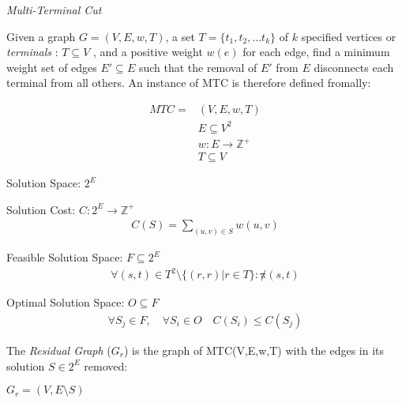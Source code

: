 \documentclass{article}
\begin{document}
\begin{definition}
{\em Multi-Terminal Cut}

Given a graph $G=(V,E,w,T)$, a set $T=\{t_1, t_2, ... t_k\}$ of $k$ specified vertices or {\em terminals} : $T \subseteq V$ , and a positive weight $w(e)$ for each edge, find a minimum weight set of edges $E' \subseteq E$ such that the removal of $E'$ from $E$ disconnects each terminal from all others.
An instance of MTC is therefore defined fromally:

\begin{align}
	\nonumber MTC = & (V,E,w,T)\\
	\nonumber & E \subseteq V^2\\
	\nonumber & w : E \rightarrow \mathbb{Z}^+\\
	\nonumber & T \subseteq V
\end{align}

Solution Space: $2^E$

Solution Cost: $C : 2^E \rightarrow \mathbb{Z}^+$
\begin{align}
	\nonumber C(S) = \displaystyle\sum\limits_{(u,v) \in S} w(u,v)
\end{align}

Feasible Solution Space: $F \subseteq 2^E$
\begin{align}
	\nonumber \forall (s, t) \in T^2 \setminus \{(r, r) | r \in T\} : \not\pi(s, t)
\end{align}

Optimal Solution Space: $O \subseteq F$
\begin{align}
	\forall S_j \in F , \quad \forall S_i \in O \quad \nonumber C(S_i) \leq C(S_j)
\end{align}

\end{definition}

\begin{definition}
The {\em Residual Graph} ($G_r$) is the graph of MTC(V,E,w,T) with the edges in its solution $S \in 2^E$ removed:

$G_r = (V, E \setminus S)$
\end{definition}
\end{document}
